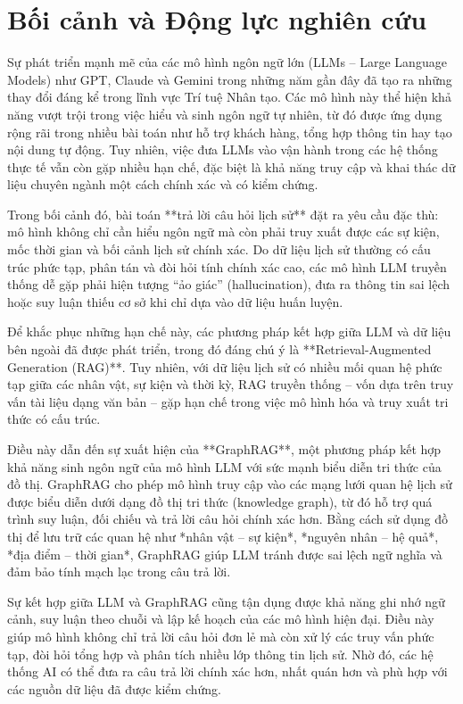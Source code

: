 
\section{Bối cảnh và Động lực nghiên cứu}

Sự phát triển mạnh mẽ của các mô hình ngôn ngữ lớn (LLMs – Large Language Models) như GPT, Claude và Gemini trong những năm gần đây đã tạo ra những thay đổi đáng kể trong lĩnh vực Trí tuệ Nhân tạo. Các mô hình này thể hiện khả năng vượt trội trong việc hiểu và sinh ngôn ngữ tự nhiên, từ đó được ứng dụng rộng rãi trong nhiều bài toán như hỗ trợ khách hàng, tổng hợp thông tin hay tạo nội dung tự động. Tuy nhiên, việc đưa LLMs vào vận hành trong các hệ thống thực tế vẫn còn gặp nhiều hạn chế, đặc biệt là khả năng truy cập và khai thác dữ liệu chuyên ngành một cách chính xác và có kiểm chứng.

Trong bối cảnh đó, bài toán **trả lời câu hỏi lịch sử** đặt ra yêu cầu đặc thù: mô hình không chỉ cần hiểu ngôn ngữ mà còn phải truy xuất được các sự kiện, mốc thời gian và bối cảnh lịch sử chính xác. Do dữ liệu lịch sử thường có cấu trúc phức tạp, phân tán và đòi hỏi tính chính xác cao, các mô hình LLM truyền thống dễ gặp phải hiện tượng “ảo giác” (hallucination), đưa ra thông tin sai lệch hoặc suy luận thiếu cơ sở khi chỉ dựa vào dữ liệu huấn luyện.

Để khắc phục những hạn chế này, các phương pháp kết hợp giữa LLM và dữ liệu bên ngoài đã được phát triển, trong đó đáng chú ý là **Retrieval-Augmented Generation (RAG)**. Tuy nhiên, với dữ liệu lịch sử có nhiều mối quan hệ phức tạp giữa các nhân vật, sự kiện và thời kỳ, RAG truyền thống – vốn dựa trên truy vấn tài liệu dạng văn bản – gặp hạn chế trong việc mô hình hóa và truy xuất tri thức có cấu trúc.

Điều này dẫn đến sự xuất hiện của **GraphRAG**, một phương pháp kết hợp khả năng sinh ngôn ngữ của mô hình LLM với sức mạnh biểu diễn tri thức của đồ thị. GraphRAG cho phép mô hình truy cập vào các mạng lưới quan hệ lịch sử được biểu diễn dưới dạng đồ thị tri thức (knowledge graph), từ đó hỗ trợ quá trình suy luận, đối chiếu và trả lời câu hỏi chính xác hơn. Bằng cách sử dụng đồ thị để lưu trữ các quan hệ như *nhân vật – sự kiện*, *nguyên nhân – hệ quả*, *địa điểm – thời gian*, GraphRAG giúp LLM tránh được sai lệch ngữ nghĩa và đảm bảo tính mạch lạc trong câu trả lời.

Sự kết hợp giữa LLM và GraphRAG cũng tận dụng được khả năng ghi nhớ ngữ cảnh, suy luận theo chuỗi và lập kế hoạch của các mô hình hiện đại. Điều này giúp mô hình không chỉ trả lời câu hỏi đơn lẻ mà còn xử lý các truy vấn phức tạp, đòi hỏi tổng hợp và phân tích nhiều lớp thông tin lịch sử. Nhờ đó, các hệ thống AI có thể đưa ra câu trả lời chính xác hơn, nhất quán hơn và phù hợp với các nguồn dữ liệu đã được kiểm chứng.

